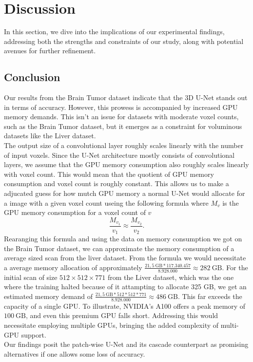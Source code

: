 \chapter{Discussion}
In this section, we dive into the implications of our experimental findings, addressing both the strengths and constraints of our study, along with potential avenues for further refinement.

\section{Conclusion}
Our results from the Brain Tumor dataset indicate that the 3D U-Net stands out in terms of accuracy. However, this prowess is accompanied by increased GPU memory demands.
This isn't an issue for datasets with moderate voxel counts, such as the Brain Tumor dataset, but it emerges as a constraint for voluminous datasets like the Liver dataset.\\[1ex]
The output size of a convolutional layer roughly scales linearly with the number of input voxels. Since the U-Net architecture mostly consists of convolutional layers,
we assume that the GPU memory consumption also roughly scales linearly with voxel count. This would mean that the quotient of GPU memory consumption and voxel count is roughly constant.
This allows us to make a adjucated guess for how mutch GPU memory a normal U-Net would allocate for a image with a given voxel count useing the following formula where $M_v$ is the GPU memory consumption for a voxel count of $v$
$$\frac{M_{v_1}}{v_1}\approx\frac{M_{v_2}}{v_2}.$$
Rearanging this formula and using the data on memory consumption we got on the Brain Tumor dataset, we can approximate the memory consumption of a average sized scan from the liver dataset.
From the formula we would necessitate a average memory allocation of approximately $\frac{21,5~\text{GB} * 117.340.457}{8.928.000}\approx282~\text{GB}$.
For the initial scan of size $512\times512\times771$ from the Liver dataset, which was the one where the training halted because of it attampting to allocate 325 GB,
we get an estimated memory demand of $\frac{21,5~\text{GB} * 512*512*771}{8.928.000}\approx486~\text{GB}$. This far exceeds the capacity of a single GPU.
To illustrate, NVIDIA's A100 offers a peak memory of $100~\text{GB}$, and even this premium GPU falls short. Addressing this would necessitate employing multiple GPUs,
bringing the added complexity of multi-GPU support.\\[1ex]
Our findings posit the patch-wise U-Net and its cascade counterpart as promising alternatives if one allows some loss of accuracy.
